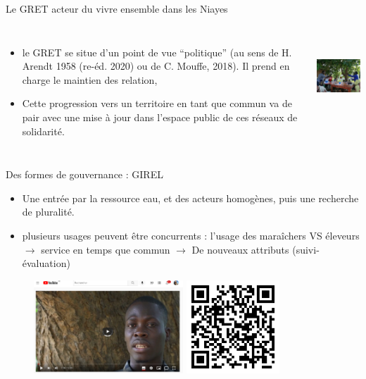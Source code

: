 \documentclass[newPxFont]{beamer}
\begin{document}
  \begin{frame}[c]{Le GRET acteur du vivre ensemble dans les Niayes}
      \vspace{-1cm}
      \begin{columns}[onlytextwidth,T]
        \column{\dimexpr\linewidth-30mm-5mm}
        \begin{itemize}
            \item le GRET se situe d’un point de vue “politique” (au sens de H. Arendt 1958 (re-éd. 2020) ou de C. Mouffe, 2018). Il prend en charge le maintien des relation,
            \item Cette progression vers un territoire en tant que commun va de pair avec une mise à jour dans l’espace public de ces réseaux de solidarité.
        \end{itemize}
        \column{30mm}
        \vspace{0.5cm}
         \includegraphics[height=3cm]{img/atelier_montroland.jpg}
      \end{columns}
  \end{frame}
      
      
  \begin{frame}[c]{Des formes de gouvernance : GIREL}
      \vspace{-1cm}
      \begin{itemize}
          \item Une entrée par la ressource eau, et des acteurs homogènes, puis une recherche de pluralité.
          \item plusieurs usages peuvent être concurrents : l’usage des maraîchers VS éleveurs $\rightarrow$ service en temps que commun $\rightarrow$ De nouveaux attributs (suivi-évaluation)
      \end{itemize}
      \begin{figure}
          \includegraphics[height=3.5cm]{img/ComMod_f'eauDiem.png}
          \includegraphics[height=3.5cm]{img/qrcode_feaudiem.png}
      \end{figure}
      
      \end{frame}
      
\end{document}
